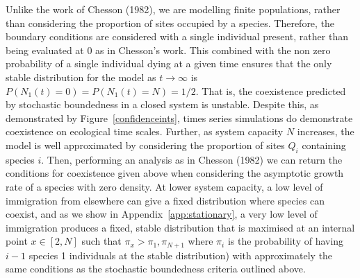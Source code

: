\documentclass[a4paper]{article}
\begin{document}
Unlike the work of Chesson (1982), we are modelling finite populations, rather than considering the proportion of sites occupied by a species. Therefore,  the boundary conditions are considered with a single individual present, rather than being evaluated at 0 as in Chesson's work. This combined with the non zero probability of a single individual dying at a given time ensures that the only stable distribution for the model as $t \to \infty$ is $P(N_1(t)=0) = P(N_1(t)=N) = 1/2.$ That is, the coexistence predicted by stochastic boundedness in a closed system is unstable. Despite this, as demonstrated by Figure~\ref{confidenceints}, times series simulations do demonstrate coexistence on ecological time scales. Further, as system capacity $N$ increases, the model is well approximated by considering the proportion of sites $Q_i$ containing species $i$. Then, performing an analysis as in Chesson (1982) we can return the conditions for coexistence given above when considering the asymptotic growth rate of a species with zero density. At lower system capacity, a low level of immigration from elsewhere can give a fixed distribution where species can coexist, and as we show in Appendix~\ref{app:stationary}, a very low level of immigration produces a fixed, stable distribution that is maximised at an internal point $x \in [2,N]$ such that $\pi_x > \pi_{1}, \pi_{N+1}$ where $\pi_i$ is the probability of having $i-1$ species 1 individuals at the stable distribution) with approximately the same conditions as the stochastic boundedness criteria outlined above.
\end{document}
